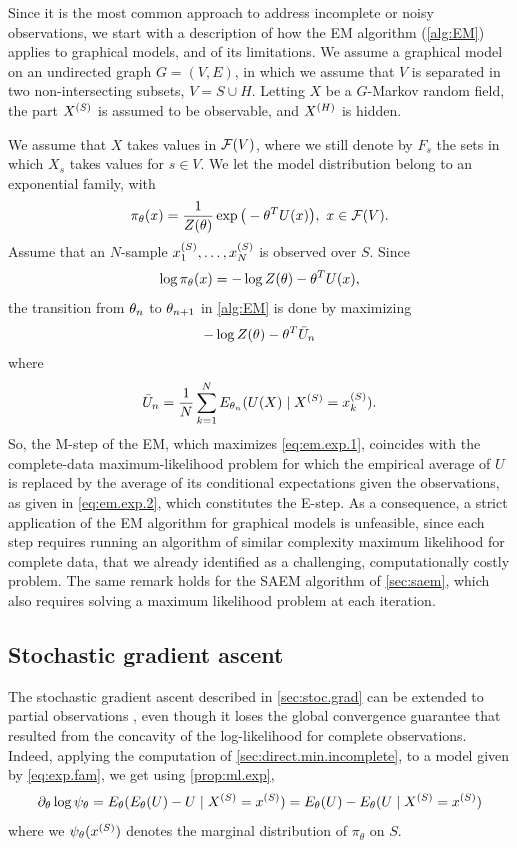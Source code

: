 Since it is the most common approach to address incomplete or noisy observations, we start with a description of how the EM algorithm (\cref{alg:EM}) applies to graphical models, and of its limitations.  
We assume a graphical model on an undirected graph $G = (V, E)$, in which we assume that $V$ is separated in two non-intersecting subsets, $V = S\cup H$. Letting $X$ be a $G$-Markov random field, the part $X^{(S)}$ is assumed to be observable, and $X^{(H)}$ is hidden.

We assume that $X$ takes values in ${\mathcal F}(V)$, where we still denote by $F_s$ the sets in which $X_s$ takes values for $s\in V$. We let the model distribution belong to an exponential family, with  
\begin{equation}
\label{eq:exp.fam}
\pi_\theta(x) = \frac{1}{Z(\theta)} \exp\big( -\theta^TU(x)\big), \ x\in {\mathcal F}(V).
\end{equation}
Assume that an $N$-sample $x_1^{(S)}, \ldots, x_N^{(S)}$ is observed over $S$.
Since 
\[
\log \pi_\theta(x) = - \log Z(\theta) - \theta^TU(x) ,
\]
the transition from $\theta_n$ to $\theta_{n+1}$ in \cref{alg:EM} is done by maximizing
\begin{equation}
\label{eq:em.exp.1}
-\log Z(\theta) -  \theta^T\bar U_n
\end{equation}
where
\begin{equation}
\label{eq:em.exp.2}
\bar U_n = \frac1N\sum_{k=1}^N E_{\theta_n}(U(X)\mid X^{(S)}=x_k^{(S)}).
\end{equation}
So, the M-step of the EM, which maximizes \cref{eq:em.exp.1},
coincides with the complete-data maximum-likelihood problem
for which the empirical average of $U$ is replaced by the average of its conditional
expectations given the observations, as given in
\cref{eq:em.exp.2}, which constitutes the E-step. As a consequence, a strict application of the EM algorithm for graphical models is unfeasible, since each step requires running an algorithm of similar complexity maximum likelihood for complete data, that we already identified as a challenging, computationally costly problem. The same remark holds for the SAEM algorithm of \cref{sec:saem}, which also requires solving a maximum likelihood problem at each iteration.

\subsection{Stochastic gradient ascent}

The stochastic gradient ascent described in \cref{sec:stoc.grad} can be extended to partial observations \citep{you89}, even though it loses the global convergence guarantee that resulted from the concavity of the log-likelihood for complete observations. Indeed, applying the computation of \cref{sec:direct.min.incomplete}, to a model given by \cref{eq:exp.fam}, we get using  \cref{prop:ml.exp},
\[
\partial_\theta \log \psi_\theta = E_\theta(E_\theta(U) - U \mid X^{(S)} =x^{(S)}) = E_\theta(U) -
E_\theta(U \mid X^{(S)}=x^{(S)})
\]
where we $\psi_\theta(x^{(S)})$ denotes the marginal distribution of $\pi_\theta$ on $S$.


